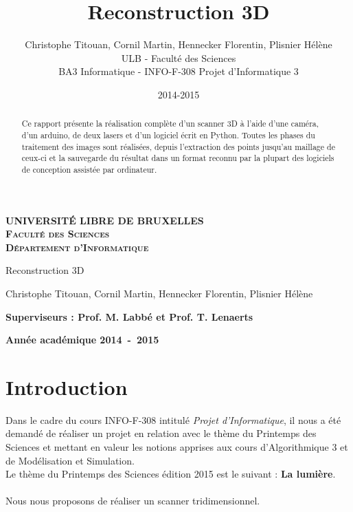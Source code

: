 \documentclass[a4paper,10pt]{report}
\title{Reconstruction 3D}
\author{Christophe Titouan, Cornil Martin, Hennecker Florentin, Plisnier Hélène\\
ULB - Faculté des Sciences\\
BA3 Informatique - INFO-F-308 Projet d’Informatique 3}
\date{2014-2015}
\begin{document}
\begin{titlepage}
\begin{center}
\textbf{\textsc{UNIVERSIT\'E LIBRE DE BRUXELLES}}\\
\textbf{\textsc{Faculté des Sciences}}\\
\textbf{\textsc{Département d'Informatique}}
\vfill{}\vfill{}
\begin{center}{\Huge Reconstruction 3D}\end{center}{\Huge \par}
\begin{center}{\large Christophe Titouan, Cornil Martin, Hennecker Florentin, Plisnier Hélène}\end{center}{\Huge \par}
\vfill{}\vfill{}
\begin{flushleft}{\large \textbf{Superviseurs : Prof. M. Labbé et Prof. T. Lenaerts}}\hfill{}\end{flushleft}{\large\par}
\vfill{}\vfill{}\enlargethispage{2.5cm}
\textbf{Année académique 2014~-~2015}
\end{center}
\end{titlepage}

\begin{abstract}
Ce rapport présente la réalisation complète d'un scanner 3D à l'aide d'une caméra, d'un arduino, de deux lasers et d'un logiciel écrit en Python. Toutes les phases du traitement des images sont réalisées, depuis l'extraction des points jusqu'au maillage de ceux-ci et la sauvegarde du résultat dans un format reconnu par la plupart des logiciels de conception assistée par ordinateur.
\end{abstract}

\tableofcontents
\newpage
\chapter{Introduction}

Dans le cadre du cours INFO-F-308 intitulé \textit{Projet d’Informatique}, il nous a été demandé de réaliser un projet en relation avec le thème du Printemps des Sciences et mettant en valeur les notions apprises aux cours d'Algorithmique 3 et de Modélisation et Simulation.\\
Le thème du Printemps des Sciences édition 2015 est le suivant : \textbf{La lumière}.\\
\\
Nous nous proposons de réaliser un scanner tridimensionnel.
\end{document}
